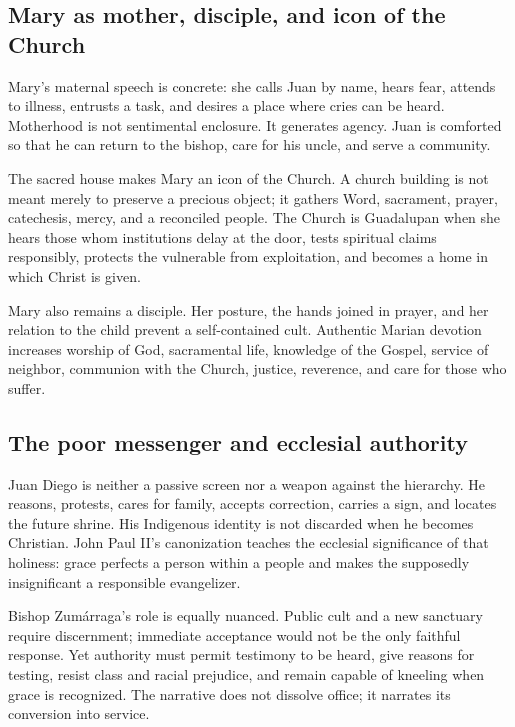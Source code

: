 \subsection{Mary as mother, disciple, and icon of the Church}

Mary's maternal speech is concrete: she calls Juan by name, hears fear, attends to illness, entrusts a task, and desires a place where cries can be heard. Motherhood is not sentimental enclosure. It generates agency. Juan is comforted so that he can return to the bishop, care for his uncle, and serve a community.

The sacred house makes Mary an icon of the Church. A church building is not meant merely to preserve a precious object; it gathers Word, sacrament, prayer, catechesis, mercy, and a reconciled people. The Church is Guadalupan when she hears those whom institutions delay at the door, tests spiritual claims responsibly, protects the vulnerable from exploitation, and becomes a home in which Christ is given.

Mary also remains a disciple. Her posture, the hands joined in prayer, and her relation to the child prevent a self-contained cult. Authentic Marian devotion increases worship of God, sacramental life, knowledge of the Gospel, service of neighbor, communion with the Church, justice, reverence, and care for those who suffer.

\subsection{The poor messenger and ecclesial authority}

Juan Diego is neither a passive screen nor a weapon against the hierarchy. He reasons, protests, cares for family, accepts correction, carries a sign, and locates the future shrine. His Indigenous identity is not discarded when he becomes Christian. John Paul II's canonization teaches the ecclesial significance of that holiness: grace perfects a person within a people and makes the supposedly insignificant a responsible evangelizer.

Bishop Zumárraga's role is equally nuanced. Public cult and a new sanctuary require discernment; immediate acceptance would not be the only faithful response. Yet authority must permit testimony to be heard, give reasons for testing, resist class and racial prejudice, and remain capable of kneeling when grace is recognized. The narrative does not dissolve office; it narrates its conversion into service.

